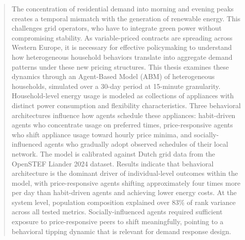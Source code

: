 \documentclass[11pt, a4paper]{article}
\begin{document}


\begin{abstract}
The concentration of residential demand into morning and evening peaks creates a temporal mismatch with the generation of renewable energy. This challenges grid operators, who have to integrate green power without compromising stability. As variable-priced contracts are spreading across Western Europe, it is necessary for effective policymaking to understand how heterogeneous household behaviors translate into aggregate demand patterns under these new pricing structures. This thesis examines these dynamics through an Agent-Based Model (ABM) of heterogeneous households, simulated over a 30-day period at 15-minute granularity. Household-level energy usage is modeled as collections of appliances with distinct power consumption and flexibility characteristics. Three behavioral architectures influence how agents schedule these appliances: habit-driven agents who concentrate usage on preferred times, price-responsive agents who shift appliance usage toward hourly price minima, and socially-influenced agents who gradually adopt observed schedules of their local network. The model is calibrated against Dutch grid data from the OpenSTEF Liander 2024 dataset. Results indicate that behavioral architecture is the dominant driver of individual-level outcomes within the model, with price-responsive agents shifting approximately four times more per day than habit-driven agents and achieving lower energy costs. At the system level, population composition explained over 83\% of rank variance across all tested metrics. Socially-influenced agents required sufficient exposure to price-responsive peers to shift meaningfully, pointing to a behavioral tipping dynamic that is relevant for demand response design.
\end{abstract}
\end{document}
